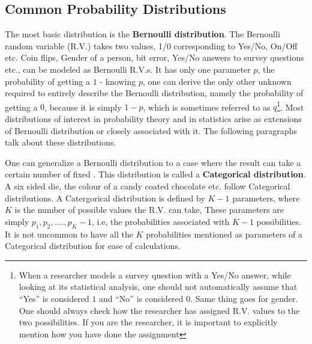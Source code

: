 \subsection {Common Probability Distributions}
The most basic distribution is the \textbf{Bernoulli distribution}. The Bernoulli random variable (R.V.) takes two values, 1/0 corresponding to Yes/No, On/Off etc. Coin flips, Gender of a person, bit error, Yes/No answers to survey questions etc., can be modeled as Bernoulli R.V.s. It has only one parameter $p$, the probability of getting a $1$ - knowing $p$, one can derive the only other unknown required to entirely describe the Bernoulli distribution, namely the probability of getting a $0$, because it is simply $1-p$, which is sometimes referred to as $q$\footnote{When a researcher models a survey question with a Yes/No answer, while looking at its statistical analysis, one should not automatically assume that ``Yes'' is considered $1$ and ``No'' is considered $0$. Same thing goes for gender. One should always check how the researcher has assigned R.V. values to the two possibilities. If you are the researcher, it is important to explicitly mention how you have done the assignment}. Most distributions of interest in probability theory and in statistics arise as extensions of Bernoulli distribution or closely associated with it. The following paragraphs talk about these distributions.

One can generalize a Bernoulli distribution to a case where the result can take a certain number of fixed  . This distribution is called a \textbf{Categorical distribution}. A six sided die, the colour of a candy coated chocolate etc. follow Categorical distributions. A Catergorical distribution is defined by $K-1$ parameters, where $K$ is the number of possible values the R.V. can take, These parameters are simply $p_1, p_2, .... , p_K-1$, i.e, the probabilities associated with $K-1$ possibilities. It is not uncommon to have all the $K$ probabilities mentioned as parameters of a Categorical distribution for ease of calculations.

